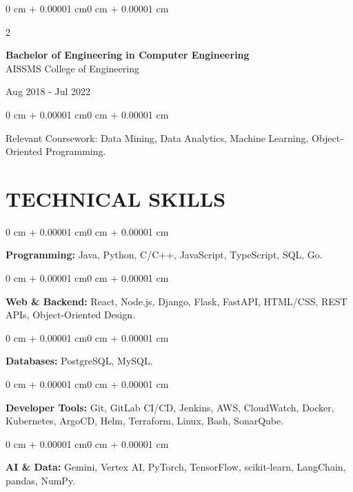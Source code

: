 \documentclass[10pt, letterpaper]{article}
\newenvironment{onecolentry}{
    \begin{adjustwidth}{0 cm + 0.00001 cm}{0 cm + 0.00001 cm}
}{
    \end{adjustwidth}
}
\newenvironment{twocolentry}[2][]{
    \onecolentry
    \def\secondColumn{#2}
    \setcolumnwidth{\fill, 4.5 cm}
    \begin{paracol}{2}
}{
    \switchcolumn \raggedleft \secondColumn
    \end{paracol}
    \endonecolentry
}
\begin{document}
\begin{twocolentry}{
    Aug 2018 - Jul 2022
}
    \textbf{Bachelor of Engineering in Computer Engineering} \\
    AISSMS College of Engineering
\end{twocolentry}
\begin{onecolentry}
Relevant Coursework: Data Mining, Data Analytics, Machine Learning, Object-Oriented Programming.
\end{onecolentry}
\section{TECHNICAL SKILLS}
\begin{onecolentry}
\textbf{Programming:} Java, Python, C/C++, JavaScript, TypeScript, SQL, Go.
\end{onecolentry}
\vspace{0.06 cm}
\begin{onecolentry}
\textbf{Web \& Backend:} React, Node.js, Django, Flask, FastAPI, HTML/CSS, REST APIs, Object-Oriented Design.
\end{onecolentry}
\vspace{0.06 cm}
\begin{onecolentry}
\textbf{Databases:} PostgreSQL, MySQL.
\end{onecolentry}
\vspace{0.06 cm}
\begin{onecolentry}
\textbf{Developer Tools:} Git, GitLab CI/CD, Jenkins, AWS, CloudWatch, Docker, Kubernetes, ArgoCD, Helm, Terraform, Linux, Bash, SonarQube.
\end{onecolentry}
\vspace{0.06 cm}
\begin{onecolentry}
\textbf{AI \& Data:} Gemini, Vertex AI, PyTorch, TensorFlow, scikit-learn, LangChain, pandas, NumPy.
\end{onecolentry}

\end{document}
